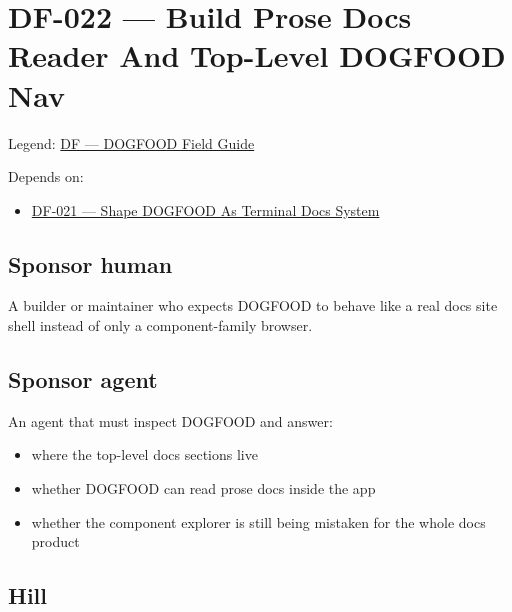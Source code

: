 \chapter{DF-022 --- Build Prose Docs Reader And Top-Level DOGFOOD Nav}\label{record-083}

\smallskip

Legend: \href{https://github.com/flyingrobots/bijou/blob/1853ad902f6bf219326409e7f743a5a1d6517dbc/docs/legends/DF-dogfood-field-guide.md}{DF --- DOGFOOD Field Guide}

Depends on:

\begin{itemize}
\tightlist
\item
  \href{https://github.com/flyingrobots/bijou/blob/cbd70612140e7a450d764b3c7be1c6af878b99bc/docs/design/DF-021-shape-dogfood-as-terminal-docs-system.md}{DF-021 --- Shape DOGFOOD As Terminal Docs System}
\end{itemize}

\section{Sponsor human}\label{record-083-sponsor-human}

A builder or maintainer who expects DOGFOOD to behave like a real docs site shell instead of only a component-family browser.

\section{Sponsor agent}\label{record-083-sponsor-agent}

An agent that must inspect DOGFOOD and answer:

\begin{itemize}
\tightlist
\item
  where the top-level docs sections live
\item
  whether DOGFOOD can read prose docs inside the app
\item
  whether the component explorer is still being mistaken for the whole docs product
\end{itemize}

\section{Hill}\label{record-083-hill}

